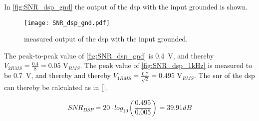 In \autoref{fig:SNR_dsp_gnd} the output of the \gls{dsp} with the input grounded is shown.

\begin{figure}[!h]
  \centering
  \texttt{[image: SNR\_dsp\_gnd.pdf]}
  \caption{measured output of the \gls{dsp} with the input grounded.}
  \label{fig:SNR_dsp_gnd}
\end{figure}

The peak-to-peak value of \autoref{fig:SNR_dsp_gnd} is \SI{0.4}{\volt}, and thereby $V_{2RMS} = \frac{0.4}{8} = 0.05$ V$_{RMS}$.
The peak value of \autoref{fig:SNR_dsp_1kHz} is measured to be \SI{0.7}{\volt}, and thereby and thereby $V_{1RMS} = \frac{0.7}{\sqrt{2}} = 0.495$ V$_{RMS}$. The \gls{snr} of the \gls{dsp} can thereby be calculated as in \autoref{}.

\begin{equation}\label{eq:snr_dsp_result}
	SNR_{DSP} = 20 \cdot log_{10}\left(\frac{0.495}{0.005}\right) = 39.91dB
	\end{equation}


